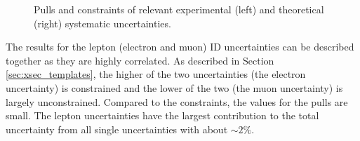 \begin{figure}[htbp!]
  \begin{center}


\caption{Pulls and constraints of relevant experimental (left) and theoretical (right) systematic uncertainties. 
       \label{fig:res_pulls}}
  \end{center}
\end{figure}

The results for the lepton (electron and muon) ID uncertainties can be described together as they are highly correlated.
As described in Section \ref{sec:xsec_templates}, the higher of the two uncertainties (the electron uncertainty) is constrained and
the lower of the two (the muon uncertainty) is largely unconstrained. Compared to the constraints, the values for the pulls 
are small. The lepton uncertainties have the largest contribution to the total uncertainty from all single uncertainties with about $\sim 2 \%$. 

